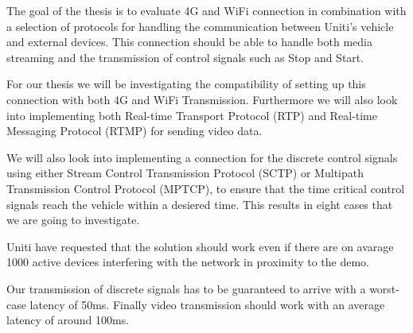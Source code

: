\documentclass[a4paper]{article}
\begin{document}


The goal of the thesis is to evaluate 4G and WiFi connection in combination with
a selection of protocols for handling the communication between Uniti's vehicle
and external devices. This connection should be able to handle both media
streaming and the transmission of control signals such as Stop and Start.




For our thesis we will be investigating the compatibility of setting up this
connection with both 4G and WiFi Transmission. Furthermore we will also look
into implementing both Real-time Transport Protocol (RTP) and Real-time
Messaging Protocol (RTMP) for sending video data. 

We will also look into implementing a connection for the discrete control
signals using either Stream Control Transmission Protocol (SCTP) or Multipath
Transmission Control Protocol (MPTCP), to ensure that the time critical control
signals reach the vehicle within a desiered time. This results in eight cases
that we are going to investigate.

Uniti have requested that the solution should work even if there are on avarage
1000 active devices interfering with the network in proximity to the
demo.

Our transmission of discrete signals has to be guaranteed to arrive with a
worst-case latency of 50ms. Finally video transmission should work with an
average latency of around 100ms.
 


\end{document}
